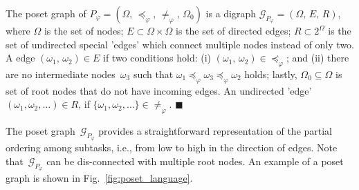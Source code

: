 \begin{definition}\label{def:poset-graph}
The poset graph of $P_{\varphi}=(\Omega,\,\preceq_{\varphi},\,\neq_{\varphi},
\,\Omega_0)$ is a digraph $\mathcal{G}_{P_\varphi}=(\Omega,\,E,\,R)$,
where $\Omega$ is the set of nodes;
$E\subset \Omega \times \Omega$ is the set of directed edges;
$R\subset 2^\Omega$ is the set of undirected special 'edges' which 
connect multiple nodes instead of only two.
A edge $(\omega_1,\,\omega_2)\in E$ if two conditions hold:
(i) $(\omega_1,\, \omega_2)\in \preceq_{\varphi}$;
{and} (ii) there are no intermediate nodes~$\omega_3$ such that
$\omega_1\preceq_{\varphi} \omega_3 \preceq_{\varphi} \omega_2$ holds;
lastly, $\Omega_0\subseteq \Omega$ is set of root nodes that do not have
incoming edges. An undirected 'edge' $(\omega_1,\omega_2,\dots)\in R$, if $\{\omega_1,\omega_2,\dots\}\in \neq_{\varphi}$.
\hfill $\blacksquare$
 \end{definition}

The poset graph~$\mathcal{G}_{P_\varphi}$ provides a straightforward
representation of the partial ordering among subtasks,
i.e., from low to high in the direction of edges.
Note that~$\mathcal{G}_{P_\varphi}$ can be dis-connected with multiple root nodes.
An example of a poset graph is shown in Fig.~\ref{fig:poset_language}.


